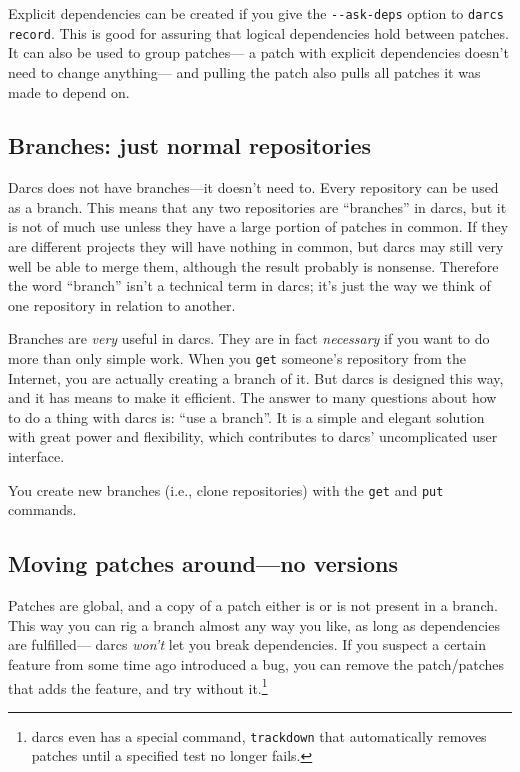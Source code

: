 Explicit dependencies can be created if you give the \verb|--ask-deps| option to \verb|darcs record|.
This is good for assuring that logical dependencies hold between patches.
It can also be used to group patches---%
a patch with explicit dependencies doesn't need to change anything---%
and pulling the patch also pulls all patches it was made to depend on.


\subsection{Branches: just normal repositories}

Darcs does not have branches---it doesn't need to.
Every repository can be used as a branch.
This means that any two repositories are ``branches'' in darcs,
but it is not of much use unless they have a large portion of patches in common.
If they are different projects they will have nothing in common,
but darcs may still very well be able to merge them,
although the result probably is nonsense.
Therefore the word ``branch'' isn't a technical term in darcs;
it's just the way we think of one repository in relation to another.

Branches are \emph{very} useful in darcs.
They are in fact \emph{necessary} if you want to do more than only simple work.
When you \verb|get| someone's repository from the Internet,
you are actually creating a branch of it.
But darcs is designed this way, and it has means to make it efficient.
The answer to many questions about how to do a thing with darcs is: ``use a branch''.
It is a simple and elegant solution with great power and flexibility,
which contributes to darcs' uncomplicated user interface.

You create new branches (i.e., clone repositories)
with the \verb|get| and \verb|put| commands.


\subsection{Moving patches around---no versions}

Patches are global, and a copy of a patch either is or is not present in a branch.
This way you can rig a branch almost any way you like,
as long as dependencies are fulfilled---%
darcs \emph{won't} let you break dependencies.
If you suspect a certain feature from some time ago introduced a bug,
you can remove the patch/patches that adds the feature,
and try without it.\footnote{%
darcs even has a special command, {\tt trackdown}
that automatically removes patches
until a specified test no longer fails.}

